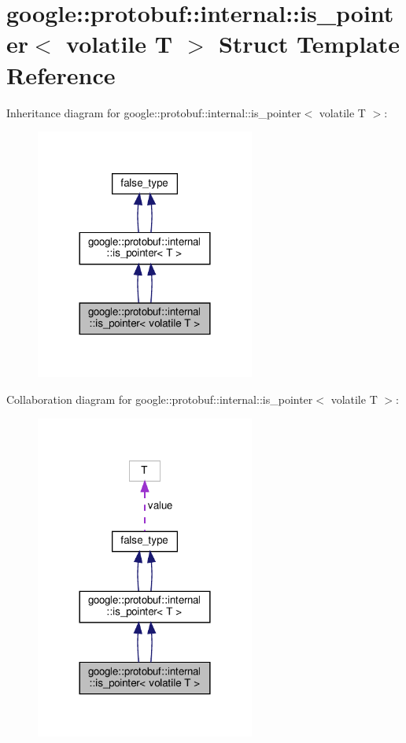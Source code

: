 \hypertarget{structgoogle_1_1protobuf_1_1internal_1_1is__pointer_3_01volatile_01T_01_4}{}\section{google\+:\+:protobuf\+:\+:internal\+:\+:is\+\_\+pointer$<$ volatile T $>$ Struct Template Reference}
\label{structgoogle_1_1protobuf_1_1internal_1_1is__pointer_3_01volatile_01T_01_4}


Inheritance diagram for google\+:\+:protobuf\+:\+:internal\+:\+:is\+\_\+pointer$<$ volatile T $>$\+:
\nopagebreak
\begin{figure}[H]
\begin{center}
\leavevmode
\includegraphics[width=204pt]{structgoogle_1_1protobuf_1_1internal_1_1is__pointer_3_01volatile_01T_01_4__inherit__graph}
\end{center}
\end{figure}


Collaboration diagram for google\+:\+:protobuf\+:\+:internal\+:\+:is\+\_\+pointer$<$ volatile T $>$\+:
\nopagebreak
\begin{figure}[H]
\begin{center}
\leavevmode
\includegraphics[width=204pt]{structgoogle_1_1protobuf_1_1internal_1_1is__pointer_3_01volatile_01T_01_4__coll__graph}
\end{center}
\end{figure}
